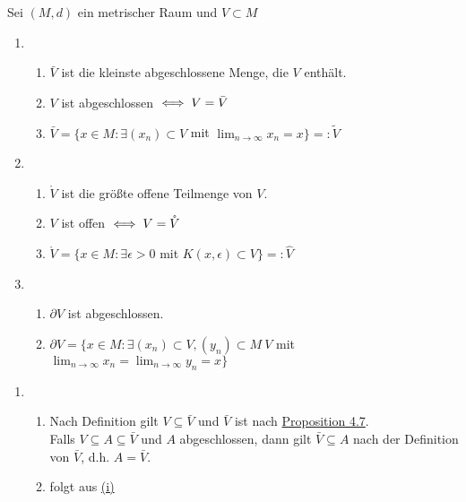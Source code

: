 \begin{prop} \label{prop:1-4.8}
	Sei $(M, d)$ ein metrischer Raum und $V \subset M$
	\begin{enumerate}[label=\alph*\upshape)]
		\item
			\begin{enumerate}
				\item \label{prop:1-4.8.a1} $\bar V$ ist die kleinste abgeschlossene Menge, die $V$ enthält.
				\item \label{prop:1-4.8.a2} $V$ ist abgeschlossen $\iff V = \bar V$
				\item \label{prop:1-4.8.a3} $\bar V = \{ x \in M: \exists (x_{n}) \subset V$ mit $\lim_{n \rightarrow \infty} x_{n} = x \} =: \tilde V$
			\end{enumerate} 
		\item 
			\begin{enumerate}
				\item \label{prop:1-4.8.b1} $\mathring V$ ist die grö{\ss}te offene Teilmenge von $V$.
				\item \label{prop:1-4.8.b2} $V$ ist offen $\iff V = \mathring V$
				\item \label{prop:1-4.8.b3} $\mathring V = \{ x \in M: \exists \epsilon > 0$ mit $K(x, \epsilon) \subset V \} =: \hat V$
			\end{enumerate} 
		\item
			\begin{enumerate}
				\item \label{prop:1-4.8.c1} $\partial V$ ist abgeschlossen.
				\item \label{prop:1-4.8.c2} $\partial V = \{ x \in M: \exists (x_{n}) \subset V, (y_{n}) \subset M \ V$ mit $ \lim_{n \rightarrow \infty} x_{n} = \lim_{n \rightarrow \infty} y_{n} = x \}$
			\end{enumerate} 
	\end{enumerate}	
	\begin{beweis}
		\begin{enumerate}[label=\alph*\upshape)]
			\item
				\begin{enumerate}
					\item \label{prop:1-4.8.a1-proof} Nach Definition gilt $V \subseteq \bar V$ und $\bar V$ ist nach \hyperref[prop:1-4.8]{Proposition 4.7}. \\
						Falls $V \subseteq A \subseteq \bar V$ und $A$ abgeschlossen, dann gilt $\bar V \subseteq A$ nach der Definition von $\bar V$, d.h. $A = \bar V$.
					\item folgt aus \hyperref[prop:1-4.8.a1]{(i)}

\end{enumerate}
\end{enumerate}
\end{beweis}
\end{prop}
